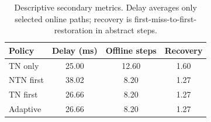 \begin{table}[t]
\centering
\caption{Descriptive secondary metrics. Delay averages only selected online paths; recovery is first-miss-to-first-restoration in abstract steps.}
\label{tab:secondary}
\par\smallskip
\footnotesize
\begin{tabular}{lccc}\toprule
Policy & Delay (ms) & Offline steps & Recovery \\ \midrule
TN only & 25.00 & 12.60 & 1.60 \\
NTN first & 38.02 & 8.20 & 1.27 \\
TN first & 26.66 & 8.20 & 1.27 \\
Adaptive & 26.66 & 8.20 & 1.27 \\
\bottomrule\end{tabular}
\end{table}
